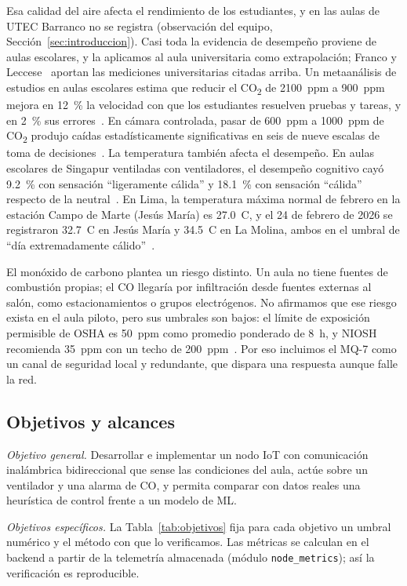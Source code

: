 \documentclass[manuscript,screen,nonacm,natbib=false]{acmart}
\newcommand{\gradC}{\textdegree{}C}
\newcommand{\COdos}{CO\textsubscript{2}}
\begin{document}
Esa calidad del aire afecta el rendimiento de los estudiantes, y en las aulas de UTEC Barranco no se registra (observación del equipo, Sección~\ref{sec:introduccion}). Casi toda la evidencia de desempeño proviene de aulas escolares, y la aplicamos al aula universitaria como extrapolación; Franco y Leccese~\cite{franco2020co2} aportan las mediciones universitarias citadas arriba. Un metaanálisis de estudios en aulas escolares estima que reducir el \COdos{} de 2100~ppm a 900~ppm mejora en 12~\% la velocidad con que los estudiantes resuelven pruebas y tareas, y en 2~\% sus errores~\cite{wargocki2020relationships}. En cámara controlada, pasar de 600~ppm a 1000~ppm de \COdos{} produjo caídas estadísticamente significativas en seis de nueve escalas de toma de decisiones~\cite{satish2012co2}. La temperatura también afecta el desempeño. En aulas escolares de Singapur ventiladas con ventiladores, el desempeño cognitivo cayó 9.2~\% con sensación ``ligeramente cálida'' y 18.1~\% con sensación ``cálida'' respecto de la neutral~\cite{cen2024students}. En Lima, la temperatura máxima normal de febrero en la estación Campo de Marte (Jesús María) es 27.0~\gradC{}, y el 24 de febrero de 2026 se registraron 32.7~\gradC{} en Jesús María y 34.5~\gradC{} en La Molina, ambos en el umbral de ``día extremadamente cálido''~\cite{senamhi2026monitoreo}.

El monóxido de carbono plantea un riesgo distinto. Un aula no tiene fuentes de combustión propias; el CO llegaría por infiltración desde fuentes externas al salón, como estacionamientos o grupos electrógenos. No afirmamos que ese riesgo exista en el aula piloto, pero sus umbrales son bajos: el límite de exposición permisible de OSHA es 50~ppm como promedio ponderado de 8~h, y NIOSH recomienda 35~ppm con un techo de 200~ppm~\cite{osha2026co}. Por eso incluimos el MQ-7 como un canal de seguridad local y redundante, que dispara una respuesta aunque falle la red.

\subsection{Objetivos y alcances}
\label{sec:objetivos}
\textit{Objetivo general.} Desarrollar e implementar un nodo IoT con comunicación inalámbrica bidireccional que sense las condiciones del aula, actúe sobre un ventilador y una alarma de CO, y permita comparar con datos reales una heurística de control frente a un modelo de ML.

\textit{Objetivos específicos.} La Tabla~\ref{tab:objetivos} fija para cada objetivo un umbral numérico y el método con que lo verificamos. Las métricas se calculan en el backend a partir de la telemetría almacenada (módulo \texttt{node\_metrics}); así la verificación es reproducible.
\end{document}
